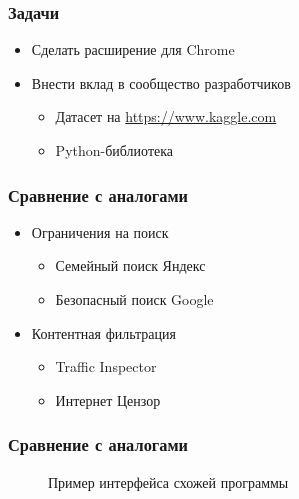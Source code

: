 \documentclass[xetex,mathserif,serif]{beamer}
\begin{document}
	\begin{frame}
		\frametitle{Задачи}
			\begin{itemize}
		 		\item Сделать расширение для Chrome
				\item Внести вклад в сообщество разработчиков
					\begin{itemize}
				    	\item Датасет на \url{https://www.kaggle.com}
				    	\item Python-библиотека
			    	\end{itemize}
			\end{itemize}
	\end{frame}	
	
	\begin{frame}
		\frametitle{Сравнение с аналогами}
			\begin{itemize}
				\item Ограничения на поиск
					\begin{itemize}
				    	\item Семейный поиск Яндекс
				    	\item Безопасный поиск Google
			    	\end{itemize}
			    \item Контентная фильтрация
					\begin{itemize}
				    	\item Traffic Inspector
				    	\item Интернет Цензор
			    	\end{itemize}
			\end{itemize}
	\end{frame}		
	
	\begin{frame}
		\frametitle{Сравнение с аналогами}
		\begin{figure}[h]
            \caption{Пример интерфейса схожей программы}
            \label{fig:image}
        \end{figure}
	\end{frame}	
\end{document}
